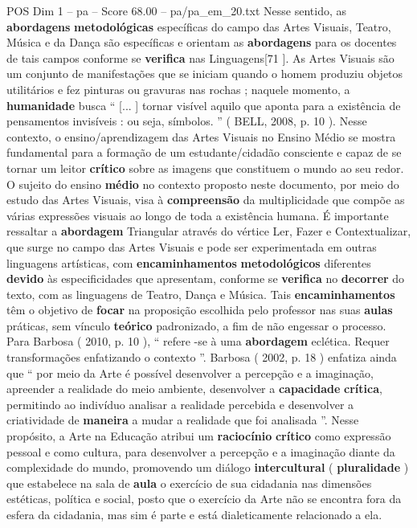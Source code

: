 \begin{textsample}{POS Dim 1 – pa – Score 68.00 – pa/pa\_em\_20.txt}
Nesse sentido, as \textbf{abordagens} \textbf{metodológicas} específicas do campo das Artes Visuais, Teatro, Música e da Dança são específicas e orientam as \textbf{abordagens} para os docentes de tais campos conforme se \textbf{verifica} nas Linguagens[71 ].
As Artes Visuais são um conjunto de manifestações que se iniciam quando o homem produziu objetos utilitários e fez pinturas ou gravuras nas rochas ; naquele momento, a \textbf{humanidade} busca “ [... ] tornar visível aquilo que aponta para a existência de pensamentos invisíveis : ou seja, símbolos. ” ( BELL, 2008, p. 10 ).
Nesse contexto, o ensino/aprendizagem das Artes Visuais no Ensino Médio se mostra fundamental para a formação de um estudante/cidadão consciente e capaz de se tornar um leitor \textbf{crítico} sobre as imagens que constituem o mundo ao seu redor.
O sujeito do ensino \textbf{médio} no contexto proposto neste documento, por meio do estudo das Artes Visuais, visa à \textbf{compreensão} da multiplicidade que compõe as várias expressões visuais ao longo de toda a existência humana.
É importante ressaltar a \textbf{abordagem} Triangular através do vértice Ler, Fazer e Contextualizar, que surge no campo das Artes Visuais e pode ser experimentada em outras linguagens artísticas, com \textbf{encaminhamentos} \textbf{metodológicos} diferentes \textbf{devido} às especificidades que apresentam, conforme se \textbf{verifica} no \textbf{decorrer} do texto, com as linguagens de Teatro, Dança e Música.
Tais \textbf{encaminhamentos} têm o objetivo de \textbf{focar} na proposição escolhida pelo professor nas suas \textbf{aulas} práticas, sem vínculo \textbf{teórico} padronizado, a fim de não engessar o processo.
Para Barbosa ( 2010, p. 10 ), “ refere -se à uma \textbf{abordagem} eclética.
Requer transformações enfatizando o contexto ”.
Barbosa ( 2002, p. 18 ) enfatiza ainda que “ por meio da Arte é possível desenvolver a percepção e a imaginação, apreender a realidade do meio ambiente, desenvolver a \textbf{capacidade} \textbf{crítica}, permitindo ao indivíduo analisar a realidade percebida e desenvolver a criatividade de \textbf{maneira} a mudar a realidade que foi analisada ”.
Nesse propósito, a Arte na Educação atribui um \textbf{raciocínio} \textbf{crítico} como expressão pessoal e como cultura, para desenvolver a percepção e a imaginação diante da complexidade do mundo, promovendo um diálogo \textbf{intercultural} ( \textbf{pluralidade} ) que estabelece na sala de \textbf{aula} o exercício de sua cidadania nas dimensões estéticas, política e social, posto que o exercício da Arte não se encontra fora da esfera da cidadania, mas sim é parte e está dialeticamente relacionado a ela.

\end{textsample}
